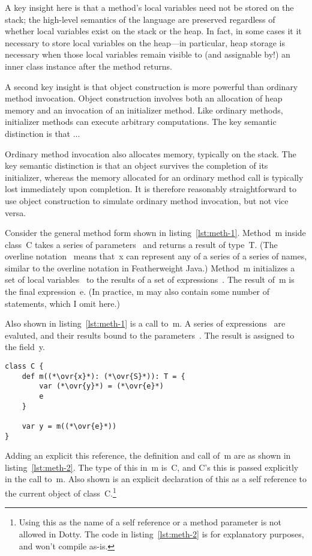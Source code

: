 A key insight here is that a method's local variables need not be stored on the stack; the high-level semantics of the language are preserved regardless of whether local variables exist on the stack or the heap. In fact, in some cases it it necessary to store local variables on the heap---in particular, heap storage is necessary when those local variables remain visible to (and assignable by!) an inner class instance after the method returns.

A second key insight is that object construction is more powerful than ordinary method invocation. Object construction involves both an allocation of heap memory and an invocation of an initializer method. Like ordinary methods, initializer methods can execute arbitrary computations. The key semantic distinction is that ...

Ordinary method invocation also allocates memory, typically on the stack. The key semantic distinction is that an object survives the completion of its initializer, whereas the memory allocated for an ordinary method call is typically lost immediately upon completion. It is therefore reasonably straightforward to use object construction to simulate ordinary method invocation, but not vice versa.

Consider the general method form shown in listing~\ref{lst:meth-1}. Method~{\cd m} inside class~{\cd C} takes a series of parameters~{\cd {}} and returns a result of type~{\cd T}. (The overline notation~{\cd {}} means that~{\cd x} can represent any of a series of a series of names, similar to the overline notation in Featherweight Java.) Method~{\cd m} initializes a set of local variables~{\cd {}} to the results of a set of expressions~{\cd {}}. The result of~{\cd m} is the final expression~{\cd e}. (In practice, {\cd m} may also contain some number of statements, which I omit here.)

Also shown in listing~\ref{lst:meth-1} is a call to~{\cd m}. A series of expressions~{\cd {}} are evaluted, and their results bound to the parameters~{\cd {}}. The result is assigned to the field~{\cd y}.

\begin{lstlisting}[float=htbp, caption={Method Transformation 1}, label={lst:meth-1}]
class C {
	def m((*\ovr{x}*): (*\ovr{S}*)): T = {
		var (*\ovr{y}*) = (*\ovr{e}*)
		e
	}

	var y = m((*\ovr{e}*))
}
\end{lstlisting}

Adding an explicit {\cd this} reference, the definition and call of~{\cd m} are as shown in listing~\ref{lst:meth-2}. The type of {\cd this} in~{\cd m} is~{\cd C}, and \mbox{{\cd C}'s} {\cd this} is passed explicitly in the call to~{\cd m}. Also shown is an explicit declaration of {\cd this} as a self reference to the current object of class~{\cd C}.\footnote{Using {\cdf this} as the name of a self reference or a method parameter is not allowed in Dotty. The code in listing~\ref{lst:meth-2} is for explanatory purposes, and won't compile as-is.}

